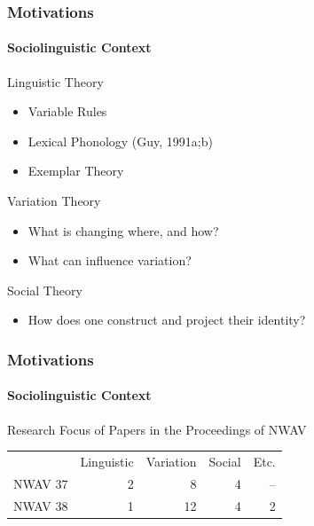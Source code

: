 \documentclass[]{beamer}
\begin{document}
\begin{frame}
	\frametitle{Motivations}
	\framesubtitle{Sociolinguistic Context}
	
	\begin{block}{Linguistic Theory}
		\begin{itemize}
			\item Variable Rules
			\item Lexical Phonology (Guy, 1991a;b)
			\item Exemplar Theory
		\end{itemize}
	\end{block}
	
	\begin{block}{Variation Theory}
		\begin{itemize}
			\item What is changing where, and how?
			\item What can influence variation?
		\end{itemize}
	\end{block}
	
	\begin{block}{Social Theory}
		\begin{itemize}
			\item How does one construct and project their identity?
		\end{itemize}
	\end{block}
\end{frame}

\begin{frame}
	\frametitle{Motivations}
	\framesubtitle{Sociolinguistic Context}
	\begin{block}{Research Focus of Papers in the Proceedings of NWAV}
		\begin{center}
		\begin{tabular}{rrrrr}
			\toprule
						&Linguistic & Variation & Social & Etc.\\
			\cmidrule{2-5}
			NWAV 37 &      2         &   8       &   4       & --      \\
			NWAV 38 &     1          &     12 &    4     &   2   \\
			\bottomrule
		\end{tabular}
		\end{center}
	\end{block}
\end{frame}
\end{document}
